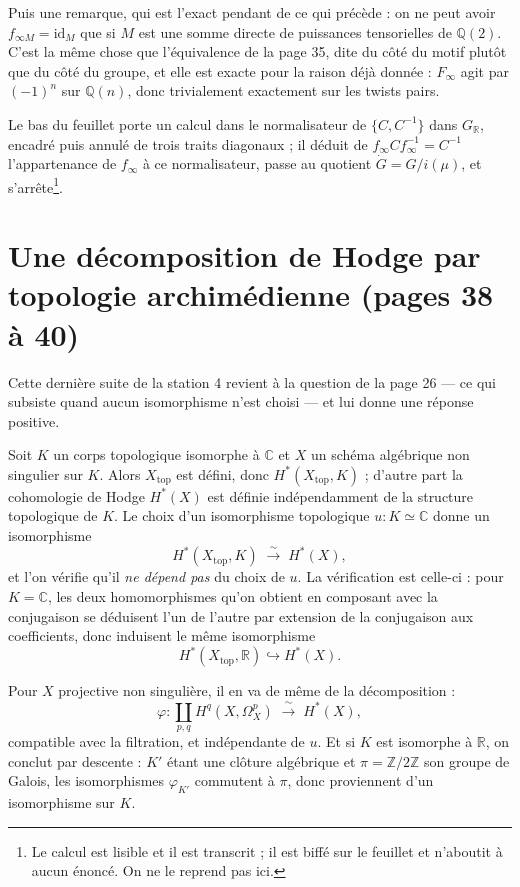 \documentclass[11pt,a4paper]{article}
\begin{document}
Puis une remarque, qui est l'exact pendant de ce qui précède : on ne peut avoir
$f_{\infty M} = \mathrm{id}_{M}$ que si $M$ est une somme directe de puissances
tensorielles de $\mathbb{Q}(2)$. C'est la même chose que l'équivalence de la
page 35, dite du côté du motif plutôt que du côté du groupe, et elle est exacte
pour la raison déjà donnée : $F_{\infty}$ agit par $(-1)^{n}$ sur
$\mathbb{Q}(n)$, donc trivialement exactement sur les twists pairs.

Le bas du feuillet porte un calcul dans le normalisateur de
$\{C, C^{-1}\}$ dans $G_{\mathbb{R}}$, encadré puis annulé de trois traits
diagonaux ; il déduit de $f_{\infty} C f_{\infty}^{-1} = C^{-1}$ l'appartenance
de $f_{\infty}$ à ce normalisateur, passe au quotient $\dot{G} = G/i(\mu)$, et
s'arrête\footnote{Le calcul est lisible et il est transcrit ; il est biffé sur
le feuillet et n'aboutit à aucun énoncé. On ne le reprend pas ici.}.

\section*{Une décomposition de Hodge par topologie archimédienne (pages 38 à 40)}

Cette dernière suite de la station 4 revient à la question de la page 26 — ce
qui subsiste quand aucun isomorphisme n'est choisi — et lui donne une réponse
positive.

Soit $K$ un corps topologique isomorphe à $\mathbb{C}$ et $X$ un schéma
algébrique non singulier sur $K$. Alors $X_{\mathrm{top}}$ est défini, donc
$H^{*}(X_{\mathrm{top}}, K)$ ; d'autre part la cohomologie de Hodge $H^{*}(X)$
est définie indépendamment de la structure topologique de $K$. Le choix d'un
isomorphisme topologique $u \colon K \simeq \mathbb{C}$ donne un isomorphisme
\[
  H^{*}(X_{\mathrm{top}}, K) \;\xrightarrow{\ \sim\ }\; H^{*}(X) ,
\]
et l'on vérifie qu'il \emph{ne dépend pas} du choix de $u$. La vérification est
celle-ci : pour $K = \mathbb{C}$, les deux homomorphismes qu'on obtient en
composant avec la conjugaison se déduisent l'un de l'autre par extension de la
conjugaison aux coefficients, donc induisent le même isomorphisme
\[
  H^{*}(X_{\mathrm{top}}, \mathbb{R}) \hookrightarrow H^{*}(X) .
\]

Pour $X$ projective non singulière, il en va de même de la décomposition :
\[
  \varphi \colon \coprod_{p,q} H^{q}(X, \Omega^{p}_{X})
  \;\xrightarrow{\ \sim\ }\; H^{*}(X) ,
\]
compatible avec la filtration, et indépendante de $u$. Et si $K$ est isomorphe à
$\mathbb{R}$, on conclut par descente : $K'$ étant une clôture algébrique et
$\pi = \mathbb{Z}/2\mathbb{Z}$ son groupe de Galois, les isomorphismes
$\varphi_{K'}$ commutent à $\pi$, donc proviennent d'un isomorphisme sur $K$.
\end{document}
